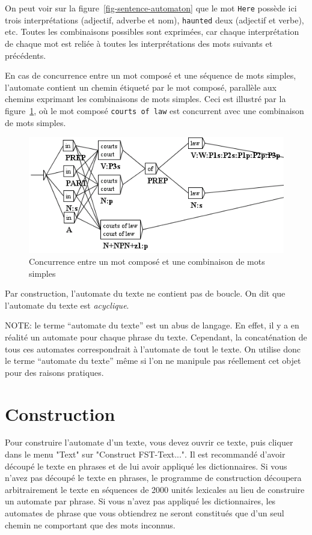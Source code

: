 \bigskip
\noindent On peut voir sur la figure~\ref{fig-sentence-automaton}
que le mot \verb+Here+ possède ici trois interprétations (adjectif, adverbe et nom),
\verb+haunted+ deux (adjectif et verbe), etc. Toutes les combinaisons possibles
sont exprimées, car chaque interprétation de chaque mot est reliée à toutes les interprétations
des mots suivants et précédents.


\bigskip
\noindent En cas de concurrence entre un mot composé et une séquence de mots simples, 
l’automate contient un chemin étiqueté par le mot composé, parallèle aux chemins exprimant
les combinaisons de mots simples. Ceci est illustré par la figure~\ref{fig-overlap}, 
où le mot composé \texttt{courts of law} est concurrent avec une combinaison de mots simples.

\begin{figure}[!ht]
\begin{center}
\includegraphics[width=12.5cm]{resources/img/fig7-2.png}
\caption{Concurrence entre un mot composé et une combinaison de mots simples\label{fig-overlap}}
\end{center}
\end{figure}

\bigskip
\noindent Par construction, l’automate du texte ne contient pas de boucle. On dit que l’automate
du texte est \textit{acyclique}.

\bigskip
\noindent NOTE: le terme ``automate du texte'' est un abus de langage. En effet, il y a en
réalité un automate pour chaque phrase du texte. Cependant, la concaténation de tous ces automates
correspondrait à l’automate de tout le texte. On utilise donc le terme ``automate du texte'' 
même si l’on ne manipule pas réellement cet objet pour des raisons pratiques.

\section{Construction}
\label{construction-text-automaton}
Pour construire l’automate d’un texte, vous devez ouvrir ce texte, puis cliquer dans le menu "Text"
sur "Construct FST-Text...". Il est recommandé d’avoir découpé le texte en phrases et
de lui avoir appliqué les dictionnaires. Si vous n’avez pas découpé le texte en phrases, le
programme de construction découpera arbitrairement le texte en séquences de 2000 unités
lexicales au lieu de construire un automate par phrase. Si vous n’avez pas appliqué les 
dictionnaires, les automates de phrase que vous obtiendrez ne seront constitués que d’un seul
chemin ne comportant que des mots inconnus.



